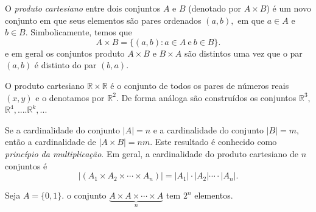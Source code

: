 \begin{frame}
\begin{defi}
O {\it produto cartesiano} entre dois conjuntos $A$ e $B$ (denotado por $A \times B $) é um novo conjunto em que seus elementos são pares ordenados $(a,b),$ em que $a \in A$ e $b \in B.$ Simbolicamente, temos que 
$$
A \times B = \{ (a,b):  a \in A \ \text{e} \ b \in B \}.
$$ e em geral os conjuntos produto  $A \times B$ e $ B \times A $  são distintos uma vez que o par $(a,b)$ é distinto do par $(b,a).$ 
\end{defi}


\begin{exem}
O produto cartesiano $\mathbb{R}\times\mathbb{R}$ é o conjunto de todos os pares de números reais $(x,y)$ e o denotamos por $\mathbb{R}^2.$  De forma análoga são construídos os conjuntos $\mathbb{R}^3,$ $\mathbb{R}^4,....\mathbb{R}^k,...$ 
\end{exem}


Se a cardinalidade do conjunto $|A| = n$ e a cardinalidade do conjunto $|B|=m,$ então a cardinalidade de $|A \times B| = n m .$ Este resultado é conhecido como {\it princípio da multiplicação}. 
Em geral, a cardinalidade do produto cartesiano de $n$ conjuntos é
$$
|(A_1\times A_2 \times \cdots \times A_n)| = |A_1| \cdot |A_2|  \cdots \cdot | A_n|.
$$

\begin{exem} 
Seja $A=\{0,1\}.$  o conjunto  $  \underbrace{A\times A \times \cdots \times A}_{n}$ tem $2^n$ elementos.
\end{exem}
\end{frame}


